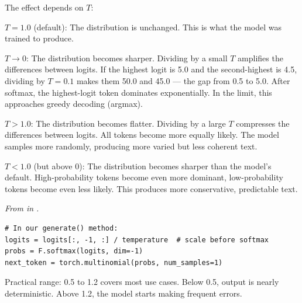 The effect depends on $T$:

\textbf{$T = 1.0$} (default): The distribution is unchanged. This is what the model was trained to produce.

\textbf{$T \to 0$}: The distribution becomes sharper. Dividing by a small $T$ amplifies the differences between logits. If the highest logit is 5.0 and the second-highest is 4.5, dividing by $T = 0.1$ makes them 50.0 and 45.0 --- the gap from 0.5 to 5.0. After softmax, the highest-logit token dominates exponentially. In the limit, this approaches greedy decoding (argmax).

\textbf{$T > 1.0$}: The distribution becomes flatter. Dividing by a large $T$ compresses the differences between logits. All tokens become more equally likely. The model samples more randomly, producing more varied but less coherent text.

\textbf{$T < 1.0$} (but above 0): The distribution becomes sharper than the model's default. High-probability tokens become even more dominant, low-probability tokens become even less likely. This produces more conservative, predictable text.

\concepttag
{\small\itshape From  in .}
\begin{lstlisting}
# In our generate() method:
logits = logits[:, -1, :] / temperature  # scale before softmax
probs = F.softmax(logits, dim=-1)
next_token = torch.multinomial(probs, num_samples=1)
\end{lstlisting}

Practical range: 0.5 to 1.2 covers most use cases. Below 0.5, output is nearly deterministic. Above 1.2, the model starts making frequent errors.


